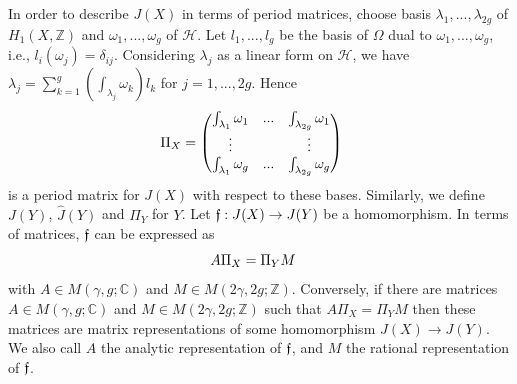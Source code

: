 \documentclass[11pt]{article}
\numberwithin{equation}{section}
\theoremstyle{plain}
\begin{document}
 In order to describe $J(X)$ in terms of period matrices, choose basis $\lambda_{1},...,\lambda_{2g}$ of $H_{1}(X,\mathbb{Z})$ and $\omega_{1},...,\omega_{g}$ of $\mathcal{H}$. Let $l_{1},...,l_{g}$ be the basis of $\Omega$ dual to $\omega_{1},...,\omega_{g}$, i.e., $l_{i}(\omega_{j})=\delta_{ij}$.  Considering
 $\lambda_{j}$ as a linear form on $\mathcal{H}$, we have $\lambda_{j}=\sum_{k=1}^{g}(\int_{\lambda_{j}}\omega_{k})l_{k}$ for $j=1,...,2g$. Hence 
\begin{equation*}
\Pi_{X}=\begin{pmatrix}\int_{\lambda_{1}}\omega_{1} & ... & \int_{\lambda_{2g}}\omega_{1} \\ \vdots & & \vdots \\ \int_{\lambda_{1}}\omega_{g} & ... & \int_{\lambda_{2g}}\omega_{g} \end{pmatrix} \text{\quad }
\end{equation*}
is a period matrix for $J(X)$ with respect to these bases.  Similarly, we define $J(Y)$, $ \widehat{J}(Y)$ and $\Pi_{Y}$ for $Y$. Let $\frak{f}:J(X)\rightarrow J(Y)$ be a homomorphism.  In terms of matrices, $\frak{f}$ can be expressed as 
\begin{equation*}
A\Pi_{X}=\Pi_{Y}M \text{\quad }
\end{equation*}
with $A\in M(\gamma,g;\mathbb{C})$ and $M\in M(2\gamma,2g;\mathbb{Z})$.  Conversely, if there are matrices $A\in M(\gamma,g;\mathbb{C})$ and $M\in M(2\gamma,2g;\mathbb{Z})$ such that $A\Pi_{X}=\Pi_{Y}M$ then these matrices are matrix representations of some homomorphism $J(X)\rightarrow J(Y)$.  We also call $A$ the analytic representation of $\frak{f}$, and $M$ the rational representation of $\frak{f}$. 
\end{document}
